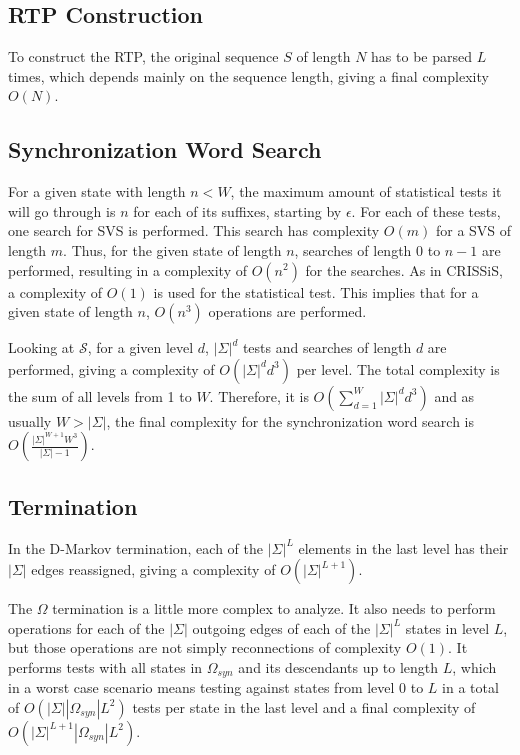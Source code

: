 {\subsection{RTP Construction}

To construct the RTP, the original sequence $S$ of length $N$ has to be parsed $L$ times, which depends mainly on the sequence length, giving a final complexity $O(N)$.

\subsection{Synchronization Word Search}

For a given state with length $n < W$, the maximum amount of statistical tests it will go through is $n$ for each of its suffixes, starting by $\epsilon$. For each of these tests, one search for SVS is performed. This search has complexity $O(m)$ for a SVS of length $m$. Thus, for the given state of length $n$, searches of length 0 to $n-1$ are performed, resulting in a complexity of $O(n^2)$ for the searches. As in CRISSiS, a complexity of $O(1)$ is used for the statistical test. This implies that for a given state of length $n$, $O(n^3)$ operations are performed.

Looking at $\mathcal{S}$, for a given level $d$, $|\Sigma|^d$ tests and searches of length $d$ are performed, giving a complexity of $O(|\Sigma|^dd^3)$ per level. The total complexity is the sum of all levels from 1 to $W$. Therefore, it is $O(\sum\limits_{d=1}^{W}|\Sigma|^dd^3)$ and as usually $W > |\Sigma|$, the final complexity for the synchronization word search is $O(\frac{|\Sigma|^{W+1}W^3}{|\Sigma|-1})$.

\subsection{Termination}

In the D-Markov termination, each of the $|\Sigma|^L$ elements in the last level has their $|\Sigma|$ edges reassigned, giving a complexity of $O(|\Sigma|^{L+1})$.

The $\Omega$ termination is a little more complex to analyze. It also needs to perform operations for each of the $|\Sigma|$ outgoing edges of each of the $|\Sigma|^{L}$ states in level $L$, but those operations are not simply reconnections of complexity $O(1)$. It performs tests with all states in $\Omega_{syn}$ and its descendants up to length $L$, which in a worst case scenario means testing against states from level 0 to $L$ in a total of $O(|\Sigma||\Omega_{syn}|L^2)$ tests per state in the last level and a final complexity of $O(|\Sigma|^{L+1}|\Omega_{syn}|L^2)$.

}
